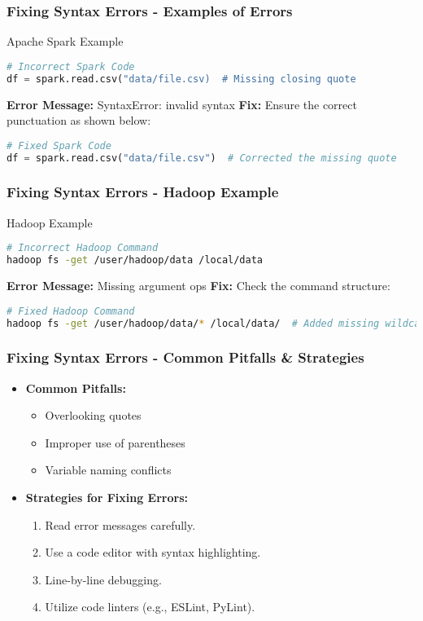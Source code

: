 \documentclass[aspectratio=169]{beamer}
\begin{document}
\begin{frame}[fragile]
    \frametitle{Fixing Syntax Errors - Examples of Errors}
    \begin{block}{Apache Spark Example}
        \begin{lstlisting}[language=Python]
# Incorrect Spark Code
df = spark.read.csv("data/file.csv)  # Missing closing quote
        \end{lstlisting}
        \textbf{Error Message:} SyntaxError: invalid syntax
        \textbf{Fix:} Ensure the correct punctuation as shown below:
        \begin{lstlisting}[language=Python]
# Fixed Spark Code
df = spark.read.csv("data/file.csv")  # Corrected the missing quote
        \end{lstlisting}
    \end{block}
\end{frame}

\begin{frame}[fragile]
    \frametitle{Fixing Syntax Errors - Hadoop Example}
    \begin{block}{Hadoop Example}
        \begin{lstlisting}[language=Bash]
# Incorrect Hadoop Command
hadoop fs -get /user/hadoop/data /local/data
        \end{lstlisting}
        \textbf{Error Message:} Missing argument ops  
        \textbf{Fix:} Check the command structure:
        \begin{lstlisting}[language=Bash]
# Fixed Hadoop Command
hadoop fs -get /user/hadoop/data/* /local/data/  # Added missing wildcard
        \end{lstlisting}
    \end{block}
\end{frame}

\begin{frame}[fragile]
    \frametitle{Fixing Syntax Errors - Common Pitfalls & Strategies}
    \begin{itemize}
        \item \textbf{Common Pitfalls:}
        \begin{itemize}
            \item Overlooking quotes
            \item Improper use of parentheses
            \item Variable naming conflicts
        \end{itemize}
        \item \textbf{Strategies for Fixing Errors:}
        \begin{enumerate}
            \item Read error messages carefully.
            \item Use a code editor with syntax highlighting.
            \item Line-by-line debugging.
            \item Utilize code linters (e.g., ESLint, PyLint).
        \end{enumerate}
    \end{itemize}
\end{frame}
\end{document}
